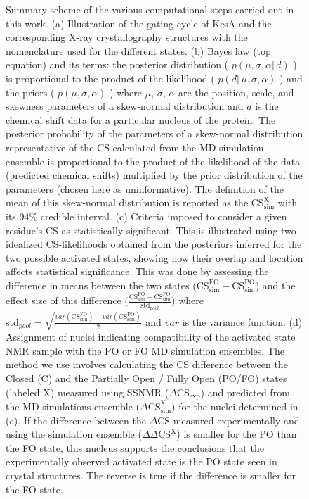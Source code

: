 \documentclass[%
 aip,
 amsmath,amssymb,
 preprint,%
]{revtex4-1}
\begin{document}
\begin{figure}
{Summary scheme of the various computational steps carried out in this work. (a) Illustration of the gating cycle of KcsA and the corresponding X-ray crystallography structures with the nomenclature used for the different states. (b) Bayes law (top equation) and its terms: the posterior distribution ( $p( \mu, \sigma, \alpha |\, d)$ ) is proportional to the product of the likelihood ( $p( d |\, \mu, \sigma, \alpha )$ ) and the priors ( $p( \mu, \sigma, \alpha )$ ) where $\mu$, $\sigma$, $\alpha$ are the position, scale, and skewness parameters of a skew-normal distribution and $d$ is the chemical shift data for a particular nucleus of the protein. The posterior probability of the parameters of a skew-normal distribution representative of the CS calculated from the MD simulation ensemble is proportional to the product of the likelihood of the data (predicted chemical shifts) multiplied by the prior distribution of the parameters (chosen here as uninformative). The definition of the mean of this skew-normal distribution  is reported as the $\text{CS}_{\text{sim}}^{\text{X}}$ with its 94\% credible interval. (c) Criteria imposed to consider a given residue's CS as statistically significant. This is illustrated using two idealized CS-likelihoods obtained from the posteriors inferred for the two possible activated states, showing how their overlap and location affects statistical significance. This was done by assessing the difference in means between the two states ($\text{CS}_{\text{sim}}^{\text{FO}}-\text{CS}_{\text{sim}}^{\text{PO}}$) and the effect size of this difference $\big(\frac{\text{CS}_{\text{sim}}^{\text{FO}}-\text{CS}_{\text{sim}}^{\text{PO}}}{\text{std}_{pool}}\big)$ where $\text{std}_{pool}=\sqrt{\frac{var(\text{CS}^{\text{FO}}_{\text{sim}})-var(\text{CS}^{\text{PO}}_{\text{sim}})}{2}}$ and $var$ is the variance function. (d) Assignment of nuclei indicating compatibility of the activated state NMR sample with the PO or FO MD simulation ensembles. The method we use involves calculating the CS difference between the Closed (C) and the Partially Open / Fully Open (PO/FO) states (labeled X) measured using SSNMR ($\Delta \text{CS}_\text{exp}$) and predicted from the MD simulations ensemble ($\Delta \text{CS}_\text{sim}^\text{X}$) for the nuclei determined in (c). If the difference between the $\Delta \text{CS}$ measured experimentally and using the simulation ensemble ($\Delta\Delta \text{CS}^\text{X}$) is smaller for the PO than the FO state, this nucleus supports the conclusions that the experimentally observed activated state is the PO state seen in crystal structures. The reverse is true if the difference is smaller for the FO state.
}
\end{figure}
\end{document}
